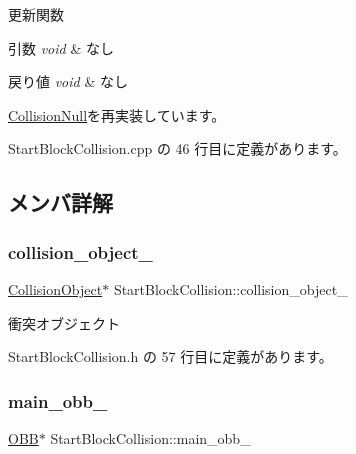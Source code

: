 更新関数 


\begin{DoxyParams}{引数}
{\em void} & なし \\
\hline
\end{DoxyParams}

\begin{DoxyRetVals}{戻り値}
{\em void} & なし \\
\hline
\end{DoxyRetVals}


\mbox{\hyperlink{class_collision_null_ad6ac0e9b06fcb4e3d19a5c3c1cadfe7e}{Collision\+Null}}を再実装しています。



 Start\+Block\+Collision.\+cpp の 46 行目に定義があります。



\subsection{メンバ詳解}
\mbox{\label{class_start_block_collision_a4c902986bebddbbb7629ab231d434dc0}} 
\subsubsection{\texorpdfstring{collision\+\_\+object\+\_\+}{collision\_object\_}}
{\footnotesize\ttfamily \mbox{\hyperlink{class_collision_object}{Collision\+Object}}$\ast$ Start\+Block\+Collision\+::collision\+\_\+object\+\_\+\hspace{0.3cm}{\ttfamily [private]}}



衝突オブジェクト 



 Start\+Block\+Collision.\+h の 57 行目に定義があります。

\mbox{\label{class_start_block_collision_a77b2824aa8efb3428c1c287836ba6aec}} 
\subsubsection{\texorpdfstring{main\+\_\+obb\+\_\+}{main\_obb\_}}
{\footnotesize\ttfamily \mbox{\hyperlink{class_o_b_b}{O\+BB}}$\ast$ Start\+Block\+Collision\+::main\+\_\+obb\+\_\+\hspace{0.3cm}{\ttfamily [private]}}



